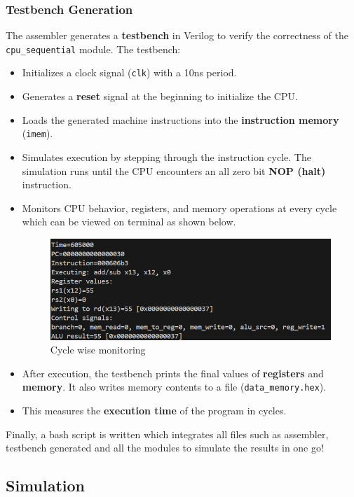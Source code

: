 \documentclass{article}
\numberwithin{figure}{section}
\numberwithin{table}{section}
\begin{document}
\subsubsection{Testbench Generation}
The assembler generates a \textbf{testbench} in Verilog to verify the correctness of the \texttt{cpu\_sequential} module. The testbench:
\begin{itemize}
\item Initializes a clock signal (\texttt{clk}) with a 10ns period.
\item Generates a \textbf{reset} signal at the beginning to initialize the CPU.
\item Loads the generated machine instructions into the \textbf{instruction memory} (\texttt{imem}).
\item Simulates execution by stepping through the instruction cycle. The simulation runs until the CPU encounters an all zero bit \textbf{NOP (halt)} instruction.
\item Monitors CPU behavior, registers, and memory operations at every cycle which can be viewed on terminal as shown below.
\begin{figure}[H]
    \centering
    \includegraphics[width=1\linewidth]{test_bench_monitor.png}
    \caption{Cycle wise monitoring}
    \label{fig:test-bench}
\end{figure}
\item After execution, the testbench prints the final values of \textbf{registers} and \textbf{memory}. It also writes memory contents to a file (\texttt{data\_memory.hex}).
\item This measures the \textbf{execution time} of the program in cycles.
\end{itemize}
Finally, a bash script is written which integrates all files such as assembler, testbench generated and all the modules to simulate the results in one go!
\subsection{Simulation}
\end{document}
